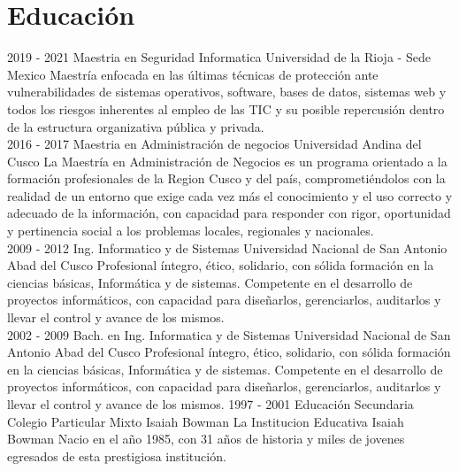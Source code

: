 \documentclass[]{friggeri-cv}
\begin{document}
\section{Educaci\'on}
\begin{entrylist}
    \entry
    {2019 - 2021}
    {Maestria en Seguridad Informatica}
    {Universidad de la Rioja - Sede Mexico}
    {Maestría enfocada en las \'ultimas t\'ecnicas de protecci\'on ante
    vulnerabilidades de sistemas operativos, software, bases de datos, sistemas
    web y todos los riesgos inherentes al empleo de las TIC y su posible repercusi\'on
    dentro de la estructura organizativa p\'ublica y privada.\\}
    \entry
    {2016 - 2017}
    {Maestria en Administraci\'on de negocios}
    {Universidad Andina del Cusco}
    {La Maestr\'ia en Administraci\'on de Negocios es un programa orientado a la formaci\'on
    profesionales de la Region Cusco y  del pa\'is, comprometi\'endolos con la realidad
    de un entorno que exige cada vez m\'as el conocimiento y el uso correcto y
    adecuado de la informaci\'on, con capacidad para responder con rigor, oportunidad
    y pertinencia social a los problemas locales, regionales y nacionales.\\}
    \entry
    {2009 - 2012}
    {Ing. Informatico y de Sistemas}
    {Universidad Nacional de San Antonio Abad del Cusco}
    {Profesional \'integro, \'etico, solidario, con s\'olida formaci\'on en la ciencias
    b\'asicas, Inform\'atica y de sistemas. Competente en el desarrollo de proyectos
    inform\'aticos, con capacidad para dise\~narlos, gerenciarlos, auditarlos y
    llevar el control y avance de los mismos.\\}
    \entry
    {2002 - 2009}
    {Bach. en Ing. Informatica y de Sistemas}
    {Universidad Nacional de San Antonio Abad del Cusco}
    {Profesional \'integro, \'etico, solidario, con s\'olida formaci\'on en la ciencias
    b\'asicas, Inform\'atica y de sistemas. Competente en el desarrollo de proyectos
    inform\'aticos, con capacidad para dise\~narlos, gerenciarlos, auditarlos y
    llevar el control y avance de los mismos.}
    \entry
    {1997 - 2001}
    {Educaci\'on Secundaria}
    {Colegio Particular Mixto Isaiah Bowman}
    {La Institucion Educativa Isaiah Bowman Nacio en el a\~no 1985, con 31 a\~nos de historia
    y miles de jovenes egresados de esta prestigiosa instituci\'on.}
\end{entrylist}
\\
\end{document}
